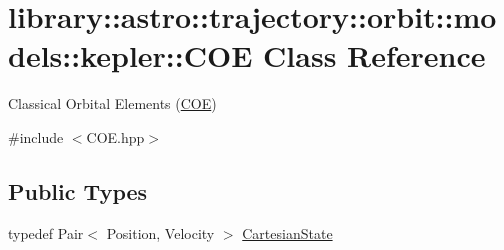 \hypertarget{classlibrary_1_1astro_1_1trajectory_1_1orbit_1_1models_1_1kepler_1_1_c_o_e}{}\section{library\+:\+:astro\+:\+:trajectory\+:\+:orbit\+:\+:models\+:\+:kepler\+:\+:C\+OE Class Reference}
\label{classlibrary_1_1astro_1_1trajectory_1_1orbit_1_1models_1_1kepler_1_1_c_o_e}


Classical Orbital Elements (\hyperlink{classlibrary_1_1astro_1_1trajectory_1_1orbit_1_1models_1_1kepler_1_1_c_o_e}{C\+OE})  




{\ttfamily \#include $<$C\+O\+E.\+hpp$>$}

\subsection*{Public Types}
\begin{DoxyCompactItemize}
\item 
typedef Pair$<$ Position, Velocity $>$ \hyperlink{classlibrary_1_1astro_1_1trajectory_1_1orbit_1_1models_1_1kepler_1_1_c_o_e_ac51b1d86203092966abcebb32f312ff4}{Cartesian\+State}
\end{DoxyCompactItemize}
